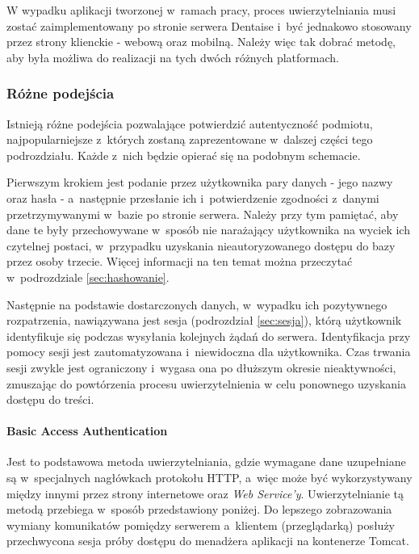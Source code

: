 \documentclass[11pt]{aghdpl}
\begin{document}
W wypadku aplikacji tworzonej w~ramach pracy, proces uwierzytelniania musi zostać zaimplementowany po stronie serwera Dentaise i~być jednakowo stosowany przez strony klienckie - webową oraz mobilną. Należy więc tak dobrać metodę, aby była możliwa do realizacji na tych dwóch różnych platformach.

\subsubsection{Różne podejścia}

Istnieją różne podejścia pozwalające potwierdzić autentyczność podmiotu, najpopularniejsze z~których zostaną zaprezentowane w~dalszej części tego podrozdziału. Każde z~nich będzie opierać się na podobnym schemacie. 

Pierwszym krokiem jest podanie przez użytkownika pary danych - jego nazwy oraz hasła - a~następnie przesłanie ich i~potwierdzenie zgodności z~danymi przetrzymywanymi w~bazie po stronie serwera. Należy przy tym pamiętać, aby dane te były przechowywane w~sposób nie narażający użytkownika na wyciek ich czytelnej postaci, w~przypadku uzyskania nieautoryzowanego dostępu do bazy przez osoby trzecie. Więcej informacji na ten temat można przeczytać w~podrozdziale \ref{sec:hashowanie}. 

Następnie na podstawie dostarczonych danych, w~wypadku ich pozytywnego rozpatrzenia, nawiązywana jest sesja (podrozdział \ref{sec:sesja}), którą użytkownik identyfikuje się podczas wysyłania kolejnych żądań do serwera. Identyfikacja przy pomocy sesji jest zautomatyzowana i~niewidoczna dla użytkownika. Czas trwania sesji zwykle jest ograniczony i~wygasa ona po dłuższym okresie nieaktywności, zmuszając do powtórzenia procesu uwierzytelnienia w celu ponownego uzyskania dostępu do treści.

\paragraph{Basic Access Authentication}

Jest to podstawowa metoda uwierzytelniania, gdzie wymagane dane uzupełniane są w~specjalnych nagłówkach protokołu HTTP, a~więc może być wykorzystywany między innymi przez strony internetowe oraz \emph{Web Service'y}. Uwierzytelnianie tą metodą przebiega w~sposób przedstawiony poniżej. Do lepszego zobrazowania wymiany komunikatów pomiędzy serwerem a~klientem (przeglądarką) posłuży przechwycona sesja próby dostępu do menadżera aplikacji na kontenerze Tomcat.
\end{document}
